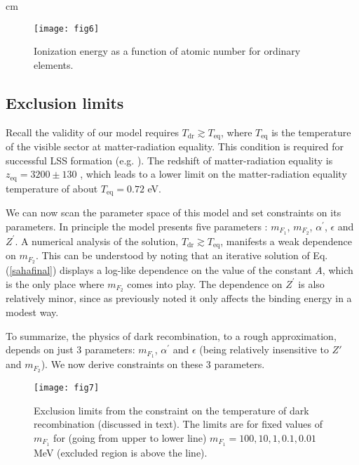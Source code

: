 \documentclass[12pt]{article}
\begin{document}
 cm

%
\begin{figure}[htpb]
    \centering
        \texttt{[image: fig6]}
    \caption{Ionization energy as a function of atomic number for ordinary elements.}
    \label{fig:Ionization}
\end{figure}
%
\newpage

\subsection{Exclusion limits}

Recall the validity of our model requires $T _{\text{dr}} \gtrsim T _{\text{eq}}$, where $T _{\text{eq}}$ is the temperature of the visible sector at matter-radiation equality. This condition is required for successful LSS formation (e.g. \cite{volkaspetraki}). The redshift of matter-radiation equality is $z _{\text{eq}} = 3200 \pm 130$ \cite{pdg}, which leads to a lower limit on the matter-radiation equality temperature of about $T _{\text{eq}} = 0.72$ eV.

We can now scan the parameter space of this model and set constraints on its parameters. In principle the model presents five parameters : $m _{F_1}$, $m _{F_2}$, $\alpha ^{'}$, $\epsilon$ and $Z ^{'}$. A numerical analysis of the solution, $T _{\text{dr}} \gtrsim T _{\text{eq}}$, manifests a weak dependence on $m _{F_2}$. This can be understood by noting that an iterative solution of Eq.(\ref{sahafinal}) displays a log-like dependence on the value of the constant $A$, which is the only place where $m _{F_2}$ comes into play. The dependence on $Z ^{'}$ is also relatively minor, since as previously noted it only affects the binding energy in a modest way.

To summarize, the physics of dark recombination, to a rough approximation, depends on just 3 parameters: $m _{F_1}$, $\alpha ^{'}$ and $\epsilon$ (being relatively insensitive to $Z'$ and $m _{F_2}$). We now derive constraints on these 3 parameters.

\begin{figure}[htpb]
    \centering
        \texttt{[image: fig7]}
    \caption{Exclusion limits from the constraint on the temperature of dark recombination (discussed in text). The limits are for fixed values of $m _{F_1}$ for (going from upper to lower line) $m _{F_1} = 100, 10, 1, 0.1, 0.01$ MeV (excluded region is above the line).}
    \label{fig:Exclusion dark recombination mf1}
\vskip 1cm
\end{figure}
\end{document}
